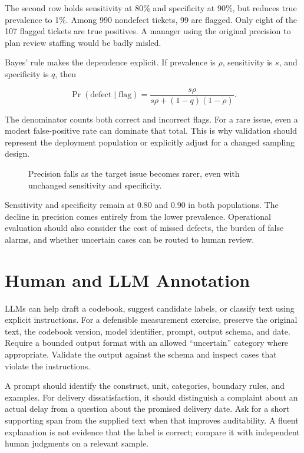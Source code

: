 The second row holds sensitivity at 80\% and specificity at 90\%, but
reduces true prevalence to 1\%. Among 990 nondefect tickets, 99 are
flagged. Only eight of the 107 flagged tickets are true positives. A
manager using the original precision to plan review staffing would be
badly misled.

Bayes' rule makes the dependence explicit. If prevalence is \(\rho\),
sensitivity is \(s\), and specificity is \(q\), then

\[
\Pr(\text{defect}\mid\text{flag})=\frac{s\rho}{s\rho+(1-q)(1-\rho)}.
\]

The denominator counts both correct and incorrect flags. For a rare
issue, even a modest false-positive rate can dominate that total. This
is why validation should represent the deployment population or
explicitly adjust for a changed sampling design.

\begin{figure}[htbp]
\centering

\caption{Precision falls as the target issue becomes rarer, even with unchanged sensitivity and specificity.}\label{fig:M05_prevalence}
\end{figure}

Sensitivity and specificity remain at 0.80 and 0.90 in both populations.
The decline in precision comes entirely from the lower prevalence.
Operational evaluation should also consider the cost of missed defects,
the burden of false alarms, and whether uncertain cases can be routed to
human review.

\hypertarget{M05-human-and-llm-annotation}{%
\section{Human and LLM Annotation}\label{M05-human-and-llm-annotation}}

\noindent LLMs can help draft a codebook, suggest candidate labels, or classify
text using explicit instructions. For a defensible measurement exercise,
preserve the original text, the codebook version, model identifier,
prompt, output schema, and date. Require a bounded output format with an
allowed ``uncertain'' category where appropriate. Validate the output
against the schema and inspect cases that violate the instructions.

A prompt should identify the construct, unit, categories, boundary
rules, and examples. For delivery dissatisfaction, it should distinguish
a complaint about an actual delay from a question about the promised
delivery date. Ask for a short supporting span from the supplied text
when that improves auditability. A fluent explanation is not evidence
that the label is correct; compare it with independent human judgments
on a relevant sample.

